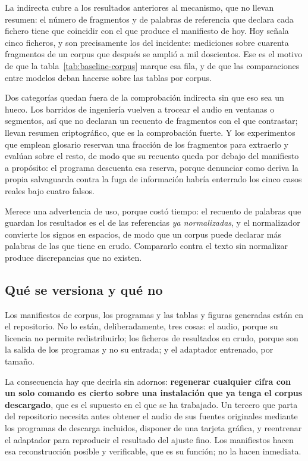 La indirecta cubre a los resultados anteriores al mecanismo, que no llevan resumen: el
número de fragmentos y de palabras de referencia que declara cada fichero tiene que
coincidir con el que produce el manifiesto de hoy. Hoy señala cinco ficheros, y son
precisamente los del incidente: mediciones sobre cuarenta fragmentos de un corpus que
después se amplió a mil doscientos. Ese es el motivo de que la
tabla~\ref{tab:baseline-corpus} marque esa fila, y de que las comparaciones entre modelos
deban hacerse sobre las tablas por corpus.

Dos categorías quedan fuera de la comprobación indirecta sin que eso sea un hueco. Los
barridos de ingeniería vuelven a trocear el audio en ventanas o segmentos, así que no
declaran un recuento de fragmentos con el que contrastar; llevan resumen criptográfico, que
es la comprobación fuerte. Y los experimentos que emplean glosario reservan una fracción de
los fragmentos para extraerlo y evalúan sobre el resto, de modo que su recuento queda por
debajo del manifiesto a propósito: el programa descuenta esa reserva, porque denunciar como
deriva la propia salvaguarda contra la fuga de información habría enterrado los cinco casos
reales bajo cuatro falsos.

Merece una advertencia de uso, porque costó tiempo: el recuento de palabras que guardan los
resultados es el de las referencias \emph{ya normalizadas}, y el normalizador convierte los
signos en espacios, de modo que un corpus puede declarar más palabras de las que tiene en
crudo. Compararlo contra el texto sin normalizar produce discrepancias que no existen.

\subsection*{Qué se versiona y qué no}

Los manifiestos de corpus, los programas y las tablas y figuras generadas están en el
repositorio. No lo están, deliberadamente, tres cosas: el audio, porque su licencia no
permite redistribuirlo; los ficheros de resultados en crudo, porque son la salida de los
programas y no su entrada; y el adaptador entrenado, por tamaño.

La consecuencia hay que decirla sin adornos: \textbf{regenerar cualquier cifra con un solo
comando es cierto sobre una instalación que ya tenga el corpus descargado}, que es el
supuesto en el que se ha trabajado. Un tercero que parta del repositorio necesita antes
obtener el audio de sus fuentes originales mediante los programas de descarga incluidos,
disponer de una tarjeta gráfica, y reentrenar el adaptador para reproducir el resultado del
ajuste fino. Los manifiestos hacen esa reconstrucción posible y verificable, que es su
función; no la hacen inmediata.

